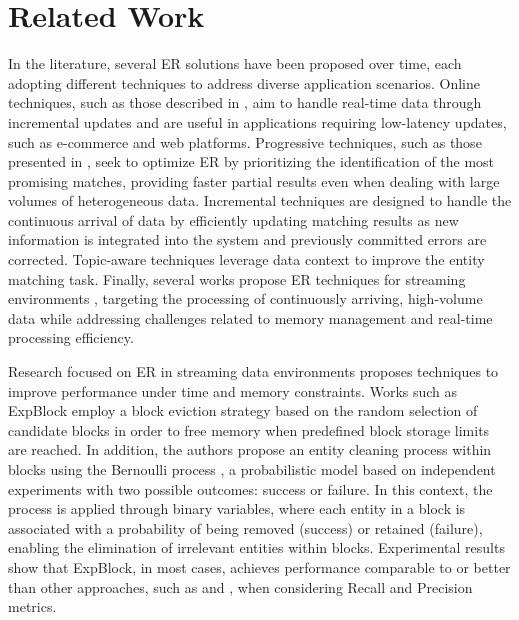 \documentclass{ieeeaccess}
\begin{document}
\section{Related Work} \label{sec:trabRelacionados}

In the literature, several ER solutions have been proposed over time, each adopting different techniques to address diverse application scenarios. Online techniques, such as those described in \cite{DBLP:conf/edbt/KarapiperisGV18, 10.14778/2556549.2556567}, aim to handle real-time data through incremental updates and are useful in applications requiring low-latency updates, such as e-commerce and web platforms. Progressive techniques, such as those presented in \cite{DBLP:conf/edbt/GazzarriH23, 8403302}, seek to optimize ER by prioritizing the identification of the most promising matches, providing faster partial results even when dealing with large volumes of heterogeneous data. Incremental techniques \cite{10.14778/2732939.2732943, DONASCIMENTO2018335, inproceedingssuperblocking} are designed to handle the continuous arrival of data by efficiently updating matching results as new information is integrated into the system and previously committed errors are corrected. Topic-aware techniques \cite{10.1145/3448016.3457238} leverage data context to improve the entity matching task. Finally, several works propose ER techniques for streaming environments \cite{info13120568, 9378127, Karapiperis2018SummarizationAF}, targeting the processing of continuously arriving, high-volume data while addressing challenges related to memory management and real-time processing efficiency.

Research focused on ER in streaming data environments proposes techniques to improve performance under time and memory constraints. Works such as ExpBlock \cite{karapiperis2023} employ a block eviction strategy based on the random selection of candidate blocks in order to free memory when predefined block storage limits are reached. In addition, the authors propose an entity cleaning process within blocks using the Bernoulli process \cite{IBE2014369}, a probabilistic model based on independent experiments with two possible outcomes: success or failure. In this context, the process is applied through binary variables, where each entity in a block is associated with a probability of being removed (success) or retained (failure), enabling the elimination of irrelevant entities within blocks. Experimental results show that ExpBlock, in most cases, achieves performance comparable to or better than other approaches, such as \cite{Gazzarri2021} and \cite{10.1145/3341105.3375776}, when considering Recall and Precision metrics.
\end{document}
